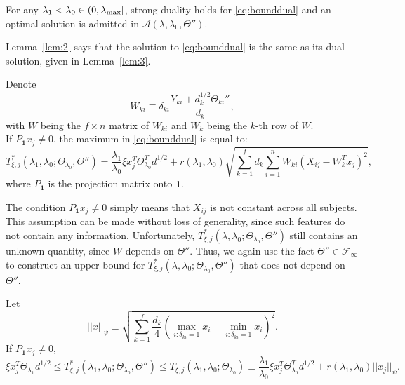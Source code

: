 \begin{lemma}
    \label{lem:2}
    For any $\lambda_1<\lambda_{0}\in (0,\lambda_\textnormal{max}]$, strong duality holds for \eqref{eq:bounddual} and an optimal solution is admitted in $\mathcal{A}(\lambda,{\lambda_0},\Theta'')$.
\end{lemma}

Lemma~\ref{lem:2} says that the solution to \eqref{eq:bounddual} is the same as its dual solution, given in Lemma~\ref{lem:3}.

\begin{lemma}
    \label{lem:3}
    Denote
    \begin{equation}
        \label{eq:w}
        W_{ki}\equiv\delta_{ki}\frac{Y_{ki}+d_k^{1/2}\Theta_{ki}''}{d_k},
    \end{equation}
    with $W$ being the $f\times n$ matrix of $W_{ki}$ and $W_k$ being the $k$-th row of $W$.\\
    If $P_{\mathbf{1}}x_j\neq 0$, the maximum in \eqref{eq:bounddual} is equal to:
    \begin{equation}
        \label{eq:tstar}
        T^*_{\xi,j}(\lambda_1,\lambda_0;\Theta_{\lambda_0},\Theta'')=\frac{\lambda_1}{\lambda_0}\xi x_j^T\Theta_{\lambda_0}^Td^{1/2}+r(\lambda_1,\lambda_0)\sqrt{\sum_{k=1}^fd_k\sum_{i=1}^nW_{ki}\left(X_{ij}-W_k^Tx_j\right)^2},
    \end{equation}
    where $P_{\mathbf{1}}$ is the projection matrix onto $\mathbf{1}$.
\end{lemma}

The condition $P_{\mathbf{1}}x_j \ne 0$ simply means that $X_{ij}$ is not constant across all subjects. This assumption can be made without loss of generality, since such features do not contain any information. Unfortunately, $T^*_{\xi,j}(\lambda,\lambda_0;\Theta_{\lambda_0},\Theta'')$ still contains an unknown quantity, since $W$ depends on $\Theta''$. Thus, we again use the fact $\Theta''\in\mathcal{F}_\infty$ to construct an upper bound for $T^*_{\xi,j}(\lambda,\lambda_0;\Theta_{\lambda_0},\Theta'')$ that does not depend on $\Theta''$.

\begin{theorem}
    \label{thm:2}
    Let
    \begin{equation}
        \label{eq:prod}
        ||x||_\psi\equiv\sqrt{\sum_{k=1}^f\frac{d_k}{4}\left(\max_{i:\delta_{ki}=1}x_i-\min_{i:\delta_{ki}=1}x_i\right)^2}.
    \end{equation}
    If $P_{\mathbf{1}}x_j\neq 0$,
    \begin{equation}
        \label{eq:gbbar}
        \xi x_j^T\Theta_{\lambda_1}d^{1/2}\leq T^*_{\xi,j}(\lambda_1,\lambda_0;\Theta_{\lambda_0},\Theta'')\leq T_{\xi,j}(\lambda_1,\lambda_0;\Theta_{\lambda_0})\equiv\frac{\lambda_1}{\lambda_0}\xi x_j^T\Theta_{\lambda_0}^Td^{1/2}+r(\lambda_1,\lambda_0)||x_j||_\psi.
    \end{equation}
\end{theorem}

